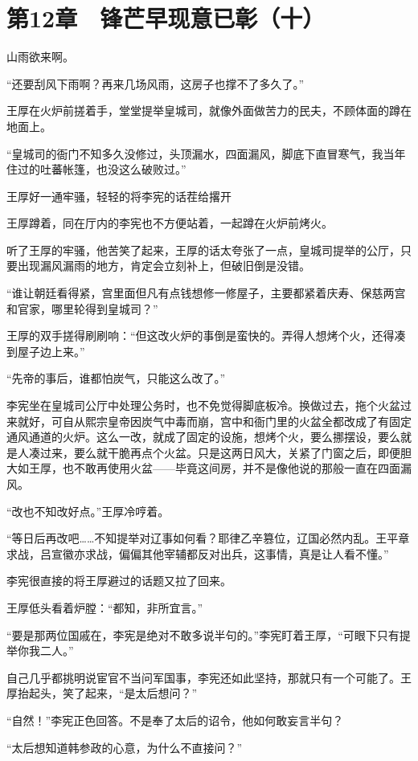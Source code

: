 \section{第12章　锋芒早现意已彰（十）}

山雨欲来啊。

“还要刮风下雨啊？再来几场风雨，这房子也撑不了多久了。”

王厚在火炉前搓着手，堂堂提举皇城司，就像外面做苦力的民夫，不顾体面的蹲在地面上。

“皇城司的衙门不知多久没修过，头顶漏水，四面漏风，脚底下直冒寒气，我当年住过的吐蕃帐篷，也没这么破败过。”

王厚好一通牢骚，轻轻的将李宪的话茬给撂开

王厚蹲着，同在厅内的李宪也不方便站着，一起蹲在火炉前烤火。

听了王厚的牢骚，他苦笑了起来，王厚的话太夸张了一点，皇城司提举的公厅，只要出现漏风漏雨的地方，肯定会立刻补上，但破旧倒是没错。

“谁让朝廷看得紧，宫里面但凡有点钱想修一修屋子，主要都紧着庆寿、保慈两宫和官家，哪里轮得到皇城司？”

王厚的双手搓得刷刷响：“但这改火炉的事倒是蛮快的。弄得人想烤个火，还得凑到屋子边上来。”

“先帝的事后，谁都怕炭气，只能这么改了。”

李宪坐在皇城司公厅中处理公务时，也不免觉得脚底板冷。换做过去，拖个火盆过来就好，可自从熙宗皇帝因炭气中毒而崩，宫中和衙门里的火盆全都改成了有固定通风通道的火炉。这么一改，就成了固定的设施，想烤个火，要么挪摆设，要么就是人凑过来，要么就干脆再点个火盆。只是这两日风大，关紧了门窗之后，即便胆大如王厚，也不敢再使用火盆——毕竟这间房，并不是像他说的那般一直在四面漏风。

“改也不知改好点。”王厚冷哼着。

“等日后再改吧……不知提举对辽事如何看？耶律乙辛篡位，辽国必然内乱。王平章求战，吕宣徽亦求战，偏偏其他宰辅都反对出兵，这事情，真是让人看不懂。”

李宪很直接的将王厚避过的话题又拉了回来。

王厚低头看着炉膛：“都知，非所宜言。”

“要是那两位国戚在，李宪是绝对不敢多说半句的。”李宪盯着王厚，“可眼下只有提举你我二人。”

自己几乎都挑明说宦官不当问军国事，李宪还如此坚持，那就只有一个可能了。王厚抬起头，笑了起来，“是太后想问？”

“自然！”李宪正色回答。不是奉了太后的诏令，他如何敢妄言半句？

“太后想知道韩参政的心意，为什么不直接问？”


